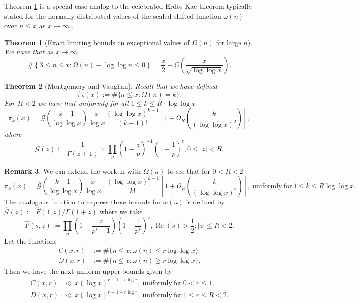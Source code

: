 \documentclass[11pt,reqno,a4letter]{article}
\numberwithin{figure}{section}
\numberwithin{table}{section}
\newcommand{\cf}{\textit{cf.\ }}
\theoremstyle{plain}
\newtheorem{theorem}{Theorem}
\numberwithin{theorem}{section}
\theoremstyle{definition}
\newtheorem{remark}[theorem]{Remark}
\renewcommand{\Re}{\operatorname{Re}}
\begin{document}
Theorem \ref{theorem_MV_Thm7.21-init_stmt} is a special case analog to the 
celebrated Erd\"os-Kac theorem typically stated for the 
normally distributed values of the scaled-shifted function $\omega(n)$ over $n \leq x$ as 
$x \rightarrow \infty$ \cite[\cf Thm.\ 7.21]{MV}. 

\begin{theorem}[Exact limiting bounds on exceptional values of $\Omega(n)$ for large $n$] 
\label{theorem_MV_Thm7.21-init_stmt} 
We have that as $x \rightarrow \infty$ 
\[
\#\left\{3 \leq n \leq x: \Omega(n) - \log\log n \leq 0\right\} = 
     \frac{x}{2} + O\left(\frac{x}{\sqrt{\log\log x}}\right). 
\]
\end{theorem} 

\begin{theorem}[Montgomery and Vaughan]
\label{theorem_HatPi_ExtInTermsOfGz} 
Recall that we have defined 
$$\widehat{\pi}_k(x) := \#\{n \leq x: \Omega(n)=k\}.$$ 
For $R < 2$ we have that uniformly for all $1 \leq k \leq R \cdot \log\log x$ 
\[
\widehat{\pi}_k(x) = \mathcal{G}\left(\frac{k-1}{\log\log x}\right) \frac{x}{\log x} 
     \frac{(\log\log x)^{k-1}}{(k-1)!} \left[1 + O_R\left(\frac{k}{(\log\log x)^2}\right)\right], 
\]
where 
\[
\mathcal{G}(z) := \frac{1}{\Gamma(z+1)} \times 
     \prod_p \left(1-\frac{z}{p}\right)^{-1} \left(1-\frac{1}{p}\right)^z, 0 \leq |z| < R. 
\]
\end{theorem} 

\begin{remark} 
We can extend the work in \cite{MV} with $\Omega(n)$ to see that 
for $0 < R < 2$ 
\[
\pi_k(x) = \widehat{\mathcal{G}}\left(\frac{k-1}{\log\log x}\right) 
     \frac{x}{\log x} \cdot \frac{(\log\log x)^{k-1}}{k!} \left[ 
     1 + O_R\left(\frac{k}{(\log\log x)^2}\right) 
     \right], 
     \mathrm{\ uniformly\ for\ } 1 \leq k \leq R\log\log x. 
\]
The analogous function to express these bounds for $\omega(n)$ is 
defined by $\widehat{\mathcal{G}}(z) := \widehat{F}(1, z) / \Gamma(1 + z)$ where 
we take 
\[
\widehat{F}(s, z) := \prod_p \left(1 + \frac{z}{p^s-1}\right) \left(1 - \frac{1}{p^s}\right)^{z}, 
     \Re(s) > \frac{1}{2}; |z| \leq R < 2. 
\]
Let the functions 
\begin{align*} 
C(x, r) & := \#\{n \leq x: \omega(n) \leq r \log\log x\} \\ 
D(x, r) & := \#\{n \leq x: \omega(n) \geq r \log\log x\}. 
\end{align*} 
Then we have the next uniform upper bounds given by 
\begin{align*} 
C(x, r) & \ll x (\log x)^{r - 1 - r \log r}, \mathrm{\ uniformly\ for\ } 0 < r \leq 1, \\ 
D(x, r) & \ll x (\log x)^{r - 1 - r \log r}, \mathrm{\ uniformly\ for\ } 1 \leq r \leq R < 2.
\end{align*} 
\end{remark} 
\end{document}
